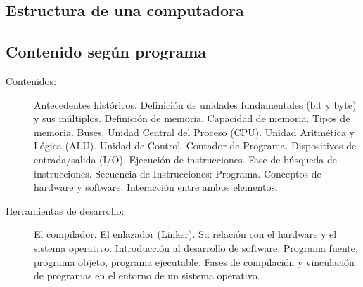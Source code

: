 \setcounter{subsection}{1}


\subsection*{Estructura de una computadora}
\subsection*{Contenido según programa}
\begin{description}
    \item[Contenidos:] Antecedentes históricos. Definición de unidades fundamentales (bit y byte) y sus múltiplos. Definición de memoria. Capacidad de memoria. Tipos de memoria. Buses. Unidad Central del Proceso (CPU). Unidad Aritmética y Lógica (ALU). Unidad de Control. Contador de Programa. Dispositivos de entrada/salida (I/O). Ejecución de instrucciones. Fase de búsqueda de instrucciones. Secuencia de Instrucciones: Programa. Conceptos de hardware y software. Interacción entre ambos elementos.
    \item[Herramientas de desarrollo:] El compilador. El enlazador (Linker). Su relación con el hardware y el sistema operativo. Introducción al desarrollo de software: Programa fuente, programa objeto, programa ejecutable. Fases de compilación y vinculación de programas en el entorno de un sistema operativo.
\end{description}


